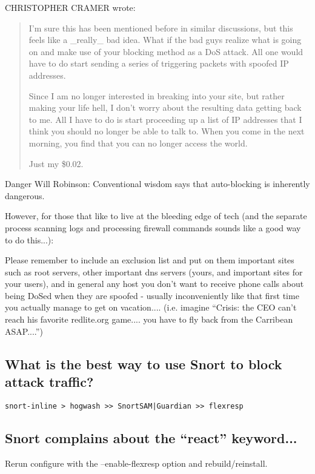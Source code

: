 \documentclass{article}
\newcommand{\myquote}[1]{\begin{quote}#1\end{quote}}
\begin{document}
CHRISTOPHER CRAMER wrote:

\myquote{
I'm sure this has been mentioned before in similar discussions, but this
feels like a \_really\_ bad idea.  What if the bad guys realize what is
going on and make use of your blocking method as a DoS attack.  All one
would have to do start sending a series of triggering packets with spoofed
IP addresses.

Since I am no longer interested in breaking into your site, but rather
making your life hell, I don't worry about the resulting data getting back
to me.  All I have to do is start proceeding up a list of IP addresses
that I think you should no longer be able to talk to.  When you come in
the next morning, you find that you can no longer access the world.

Just my \$0.02.
}

Danger Will Robinson: Conventional wisdom says that 
auto-blocking is inherently dangerous. 

However, for those that like to live at the 
bleeding edge of tech (and the separate
process scanning logs and processing
firewall commands sounds like a good 
way to do this...):

Please remember to include an exclusion list and put 
on them important sites such as root servers, other 
important dns servers (yours, and important sites for 
your users), and in general any host you don't want 
to receive phone calls about being DoSed when
they are spoofed - usually inconveniently like that 
first time you actually manage to get on vacation....
(i.e. imagine ``Crisis: the CEO can't reach his favorite 
redlite.org game.... you have to fly back from the 
Carribean ASAP....'')   

\subsection{What is the best way to use Snort to block attack traffic?}

\begin{verbatim}snort-inline > hogwash >> SnortSAM|Guardian >> flexresp\end{verbatim}


\subsection{Snort complains about the ``react'' keyword...}

Rerun configure with the --enable-flexresp option and rebuild/reinstall.
\end{document}
